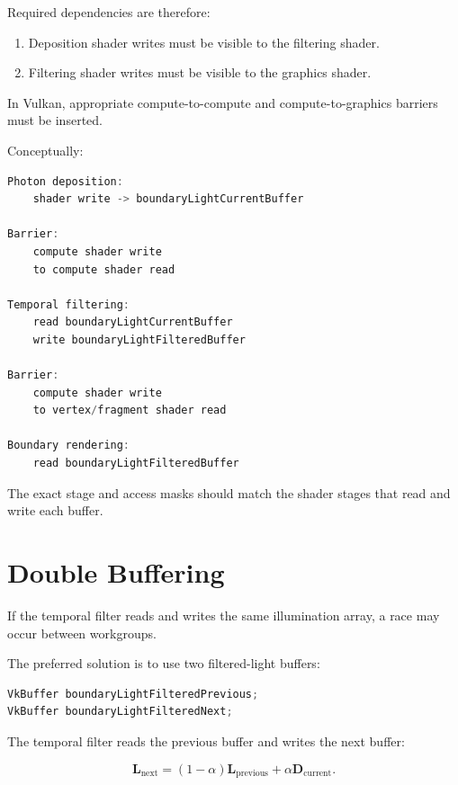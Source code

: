 \documentclass[11pt]{article}
\begin{document}
Required dependencies are therefore:

\begin{enumerate}
    \item Deposition shader writes must be visible to the filtering shader.
    \item Filtering shader writes must be visible to the graphics shader.
\end{enumerate}

In Vulkan, appropriate compute-to-compute and compute-to-graphics barriers must
be inserted.

Conceptually:

\begin{lstlisting}[language=C++]
Photon deposition:
    shader write -> boundaryLightCurrentBuffer

Barrier:
    compute shader write
    to compute shader read

Temporal filtering:
    read boundaryLightCurrentBuffer
    write boundaryLightFilteredBuffer

Barrier:
    compute shader write
    to vertex/fragment shader read

Boundary rendering:
    read boundaryLightFilteredBuffer
\end{lstlisting}

The exact stage and access masks should match the shader stages that read and
write each buffer.

\section{Double Buffering}

If the temporal filter reads and writes the same illumination array, a race may
occur between workgroups.

The preferred solution is to use two filtered-light buffers:

\begin{lstlisting}[language=C++]
VkBuffer boundaryLightFilteredPrevious;
VkBuffer boundaryLightFilteredNext;
\end{lstlisting}

The temporal filter reads the previous buffer and writes the next buffer:

\begin{equation}
    \mathbf{L}_{\mathrm{next}}
    =
    \left(1-\alpha\right)
    \mathbf{L}_{\mathrm{previous}}
    +
    \alpha
    \mathbf{D}_{\mathrm{current}}.
\end{equation}
\end{document}
